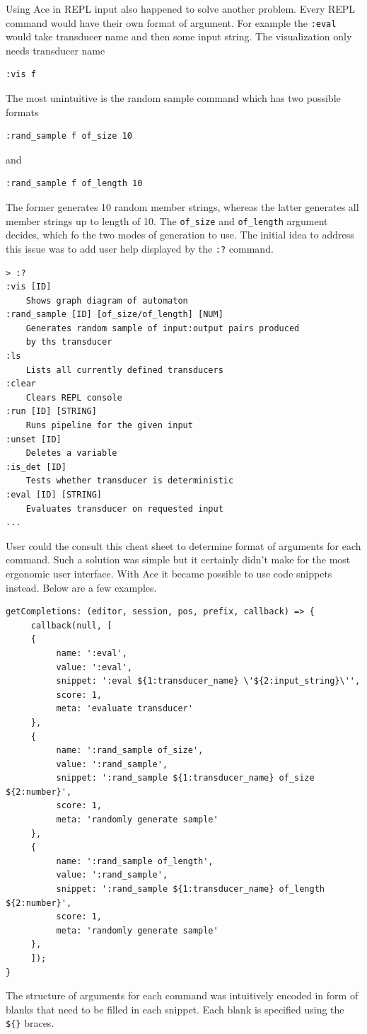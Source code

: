 Using Ace in REPL input also happened to solve another problem. Every REPL command would have their own format of argument. For example the \texttt{:eval} would take transducer name and then some input string. The visualization only needs transducer name
\begin{lstlisting}
:vis f
\end{lstlisting}
 The most unintuitive is the random sample command which has two possible formats
 \begin{lstlisting}
:rand_sample f of_size 10
 \end{lstlisting}
and
 \begin{lstlisting}
:rand_sample f of_length 10
\end{lstlisting}
The former generates 10 random member strings, whereas the latter generates all member strings up to length of 10.
The \texttt{of\_size} and \texttt{of\_length} argument decides, which fo the two modes of generation to use. The initial idea to address this issue was to add user help displayed by the \texttt{:?} command.
\begin{lstlisting}
> :?
:vis [ID]
    Shows graph diagram of automaton
:rand_sample [ID] [of_size/of_length] [NUM]
    Generates random sample of input:output pairs produced 
    by ths transducer
:ls
    Lists all currently defined transducers
:clear
    Clears REPL console
:run [ID] [STRING]
    Runs pipeline for the given input
:unset [ID]
    Deletes a variable
:is_det [ID]
    Tests whether transducer is deterministic
:eval [ID] [STRING]
    Evaluates transducer on requested input
...
\end{lstlisting}
User could the consult this cheat sheet to determine format of arguments for each command. Such a solution was simple but it certainly didn't make for the most ergonomic user interface. With Ace it became possible to use code snippets instead.
Below are a few examples.
\begin{lstlisting}
getCompletions: (editor, session, pos, prefix, callback) => {
     callback(null, [
     {
          name: ':eval',
          value: ':eval',
          snippet: ':eval ${1:transducer_name} \'${2:input_string}\'',
          score: 1,
          meta: 'evaluate transducer'
     },
     {
          name: ':rand_sample of_size',
          value: ':rand_sample',
          snippet: ':rand_sample ${1:transducer_name} of_size ${2:number}',
          score: 1,
          meta: 'randomly generate sample'
     },
     {
          name: ':rand_sample of_length',
          value: ':rand_sample',
          snippet: ':rand_sample ${1:transducer_name} of_length ${2:number}',
          score: 1,
          meta: 'randomly generate sample'
     },
     ]);
}
\end{lstlisting}
The structure of arguments for each command was intuitively encoded in form
of blanks that need to be filled in each snippet. Each blank is specified using the \texttt{\$\{\}} braces.

